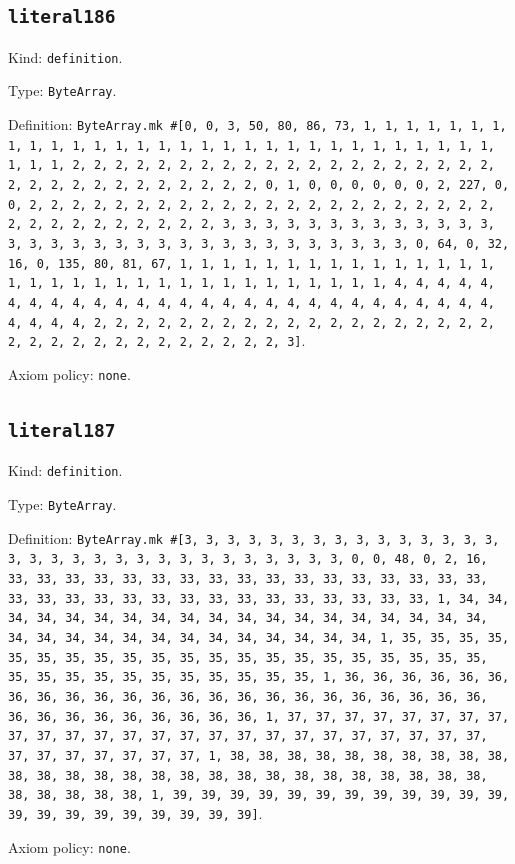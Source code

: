 \documentclass[11pt]{article}
\begin{document}
\subsection*{\texttt{literal186}}
\noindent Kind: \texttt{definition}.\par
\noindent Type: \texttt{ByteArray}.\par
\noindent Definition: \texttt{ByteArray.mk \#[0, 0, 3, 50, 80, 86, 73, 1, 1, 1, 1, 1, 1, 1, 1, 1, 1, 1, 1, 1, 1, 1, 1, 1, 1, 1, 1, 1, 1, 1, 1, 1, 1, 1, 1, 1, 1, 1, 1, 1, 2, 2, 2, 2, 2, 2, 2, 2, 2, 2, 2, 2, 2, 2, 2, 2, 2, 2, 2, 2, 2, 2, 2, 2, 2, 2, 2, 2, 2, 2, 2, 2, 0, 1, 0, 0, 0, 0, 0, 0, 2, 227, 0, 0, 2, 2, 2, 2, 2, 2, 2, 2, 2, 2, 2, 2, 2, 2, 2, 2, 2, 2, 2, 2, 2, 2, 2, 2, 2, 2, 2, 2, 2, 2, 2, 2, 3, 3, 3, 3, 3, 3, 3, 3, 3, 3, 3, 3, 3, 3, 3, 3, 3, 3, 3, 3, 3, 3, 3, 3, 3, 3, 3, 3, 3, 3, 3, 3, 0, 64, 0, 32, 16, 0, 135, 80, 81, 67, 1, 1, 1, 1, 1, 1, 1, 1, 1, 1, 1, 1, 1, 1, 1, 1, 1, 1, 1, 1, 1, 1, 1, 1, 1, 1, 1, 1, 1, 1, 1, 1, 1, 4, 4, 4, 4, 4, 4, 4, 4, 4, 4, 4, 4, 4, 4, 4, 4, 4, 4, 4, 4, 4, 4, 4, 4, 4, 4, 4, 4, 4, 4, 4, 4, 2, 2, 2, 2, 2, 2, 2, 2, 2, 2, 2, 2, 2, 2, 2, 2, 2, 2, 2, 2, 2, 2, 2, 2, 2, 2, 2, 2, 2, 2, 2, 2, 3]}.\par
\noindent Axiom policy: \texttt{none}.\par
\subsection*{\texttt{literal187}}
\noindent Kind: \texttt{definition}.\par
\noindent Type: \texttt{ByteArray}.\par
\noindent Definition: \texttt{ByteArray.mk \#[3, 3, 3, 3, 3, 3, 3, 3, 3, 3, 3, 3, 3, 3, 3, 3, 3, 3, 3, 3, 3, 3, 3, 3, 3, 3, 3, 3, 3, 3, 3, 0, 0, 48, 0, 2, 16, 33, 33, 33, 33, 33, 33, 33, 33, 33, 33, 33, 33, 33, 33, 33, 33, 33, 33, 33, 33, 33, 33, 33, 33, 33, 33, 33, 33, 33, 33, 33, 33, 1, 34, 34, 34, 34, 34, 34, 34, 34, 34, 34, 34, 34, 34, 34, 34, 34, 34, 34, 34, 34, 34, 34, 34, 34, 34, 34, 34, 34, 34, 34, 34, 34, 1, 35, 35, 35, 35, 35, 35, 35, 35, 35, 35, 35, 35, 35, 35, 35, 35, 35, 35, 35, 35, 35, 35, 35, 35, 35, 35, 35, 35, 35, 35, 35, 35, 1, 36, 36, 36, 36, 36, 36, 36, 36, 36, 36, 36, 36, 36, 36, 36, 36, 36, 36, 36, 36, 36, 36, 36, 36, 36, 36, 36, 36, 36, 36, 36, 36, 1, 37, 37, 37, 37, 37, 37, 37, 37, 37, 37, 37, 37, 37, 37, 37, 37, 37, 37, 37, 37, 37, 37, 37, 37, 37, 37, 37, 37, 37, 37, 37, 37, 1, 38, 38, 38, 38, 38, 38, 38, 38, 38, 38, 38, 38, 38, 38, 38, 38, 38, 38, 38, 38, 38, 38, 38, 38, 38, 38, 38, 38, 38, 38, 38, 38, 1, 39, 39, 39, 39, 39, 39, 39, 39, 39, 39, 39, 39, 39, 39, 39, 39, 39, 39, 39, 39, 39]}.\par
\noindent Axiom policy: \texttt{none}.\par
\end{document}
